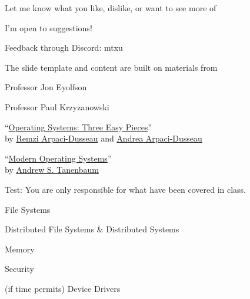 \begin{slide}


    Let me know what you like, dislike, or want to see more of
    \bigskip
    
    I'm open to suggestions!
	\bigskip
	
	Feedback through Discord: mtxu

\end{slide}

\begin{slide}

	
	The slide template and content are built on materials from 
	\bigskip
	
	Professor Jon Eyolfson
	\medskip
	
	Professor  Paul Krzyzanowski
	\medskip
	
\end{slide}

\begin{slide}


    ``\href{https://pages.cs.wisc.edu/~remzi/OSTEP/}
	   {Operating Systems: Three Easy Pieces}'' \\
    by \href{http://www.cs.wisc.edu/~remzi/}{Remzi Arpaci-Dusseau}
    and \href{http://www.cs.wisc.edu/~dusseau/}{Andrea Arpaci-Dusseau}
    \bigskip

    ``\href{https://en.wikipedia.org/wiki/Modern_Operating_Systems}
           {Modern Operating Systems}'' \\
    by \href{https://en.wikipedia.org/wiki/Andrew_S._Tanenbaum}{Andrew S. Tanenbaum}
    \bigskip
							      
    Test: You are only responsible for what have been covered in class.

\end{slide}

\begin{slide}

	
	File Systems
	\bigskip

	Distributed File Systems \& Distributed Systems
	\bigskip
	
	Memory
	\bigskip
	
	Security
	\bigskip
	
	(if time permits) Device Drivers

\end{slide}

